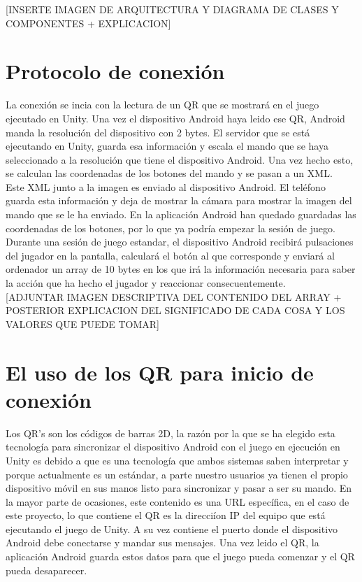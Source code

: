 [INSERTE IMAGEN DE ARQUITECTURA Y DIAGRAMA DE CLASES Y COMPONENTES  + EXPLICACION]


\section{Protocolo de conexi\'on}
\label{cap4:sec:protocolo}

La conexi\'on se incia con la lectura de un QR que se mostrar\'a en el juego ejecutado en Unity. Una vez el dispositivo Android haya leido ese QR, Android manda la resoluci\'on del dispositivo con 2 bytes. 
El servidor que se est\'a ejecutando en Unity, guarda esa informaci\'on y escala el mando que se haya seleccionado a la resoluci\'on que tiene el dispositivo Android. Una vez hecho esto, se calculan las coordenadas de los botones del mando y se pasan a un XML.
\\
Este XML junto a la imagen es enviado al dispositivo Android. El tel\'efono guarda esta informaci\'on y deja de mostrar la c\'amara para mostrar la imagen del mando que se le ha enviado. En la aplicaci\'on Android han quedado guardadas las coordenadas de los botones, por lo que ya podr\'ia empezar la sesi\'on de juego.
\\
Durante una sesi\'on de juego estandar, el dispositivo Android recibir\'a pulsaciones del jugador en la pantalla, calcular\'a el bot\'on al que corresponde y enviar\'a al ordenador un array de 10 bytes en los que ir\'a la informaci\'on necesaria para saber la acci\'on que ha hecho el jugador y reaccionar consecuentemente.
\\

[ADJUNTAR IMAGEN DESCRIPTIVA DEL CONTENIDO DEL ARRAY + POSTERIOR EXPLICACION DEL SIGNIFICADO DE CADA COSA Y LOS VALORES QUE PUEDE TOMAR]

\section{El uso de los QR para inicio de conexi\'on}
\label{cap4:QR}

Los QR's son los c\'odigos de barras 2D, la raz\'on por la que se ha elegido esta tecnolog\'ia para sincronizar el dispositivo Android con el juego en ejecuci\'on en Unity es debido a que es una tecnolog\'ia que ambos sistemas saben interpretar y porque actualmente es un est\'andar, a parte nuestro usuarios ya tienen el propio dispositivo m\'ovil en sus manos listo para sincronizar y pasar a ser su mando. En la mayor parte de ocasiones, este contenido es una URL espec\'ifica, en el caso de este proyecto, lo que contiene el QR es la direcci\'ion IP del equipo que est\'a ejecutando el juego de Unity. A su vez contiene el puerto donde el dispositivo Android debe conectarse y mandar sus mensajes. Una vez leido el QR, la aplicaci\'on Android guarda estos datos para que el juego pueda comenzar y el QR pueda desaparecer. 
\\

